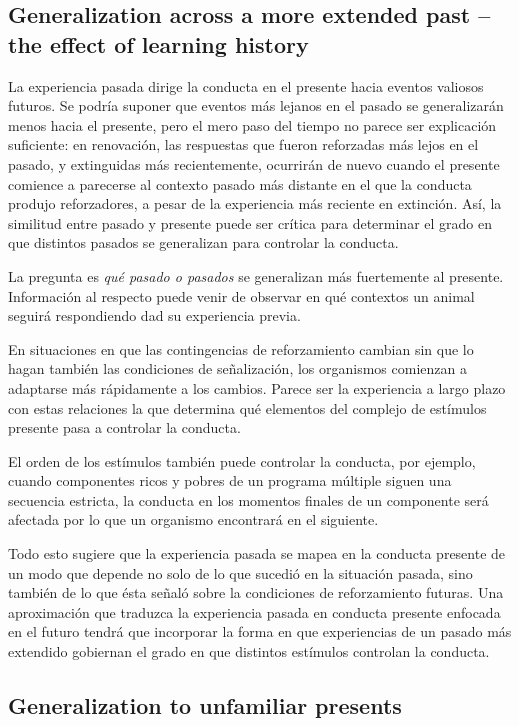 \documentclass[a4paper,12pt]{article}
\begin{document}
\subsection{Generalization across a more extended past -- the effect of learning history}

La experiencia pasada dirige la conducta en el presente hacia eventos valiosos futuros. Se podría suponer que eventos más lejanos en el pasado se generalizarán menos hacia el presente, pero el mero paso del tiempo no parece ser explicación suficiente: en renovación, las respuestas que fueron reforzadas más lejos en el pasado, y extinguidas más recientemente, ocurrirán de nuevo cuando el presente comience a parecerse al contexto pasado más distante en el que la conducta produjo reforzadores, a pesar de la experiencia más reciente en extinción. Así, la similitud entre pasado y presente puede ser crítica para determinar el grado en que distintos pasados se generalizan para controlar la conducta.

La pregunta es {\itshape qué pasado o pasados} se generalizan más fuertemente al presente. Información al respecto puede venir de observar en qué contextos un animal seguirá respondiendo dad su experiencia previa.

En situaciones en que las contingencias de reforzamiento cambian sin que lo hagan también las condiciones de señalización, los organismos comienzan a adaptarse más rápidamente a los cambios. Parece ser la experiencia a largo plazo con estas relaciones la que determina qué elementos del complejo de estímulos presente pasa a controlar la conducta.

El orden de los estímulos también puede controlar la conducta, por ejemplo, cuando componentes ricos y pobres de un programa múltiple siguen una secuencia estricta, la conducta en los momentos finales de un componente será afectada por lo que un organismo encontrará en el siguiente.

Todo esto sugiere que la experiencia pasada se mapea en la conducta presente de un modo que depende no solo de lo que sucedió en la situación pasada, sino también de lo que ésta señaló sobre la condiciones de reforzamiento futuras. Una aproximación que traduzca la experiencia pasada en conducta presente enfocada en el futuro tendrá que incorporar la forma en que experiencias de un pasado más extendido gobiernan el grado en que distintos estímulos controlan la conducta.

\subsection{Generalization to unfamiliar presents}
\end{document}

